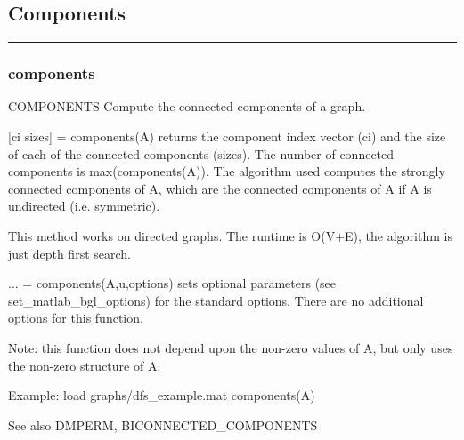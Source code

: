 \subsection*{Components}
\vspace{1cm}
\hrule
\subsubsection*{components}
\begin{mcode}
  COMPONENTS Compute the connected components of a graph.
 
  [ci sizes] = components(A) returns the component index vector (ci) and
  the size of each of the connected components (sizes).  The number of
  connected components is max(components(A)).  The algorithm used computes
  the strongly connected components of A, which are the connected
  components of A if A is undirected (i.e. symmetric).  
 
  This method works on directed graphs.
  The runtime is O(V+E), the algorithm is just depth first search.
 
  ... = components(A,u,options) sets optional parameters (see 
  set_matlab_bgl_options) for the standard options.
    There are no additional options for this function.
 
  Note: this function does not depend upon the non-zero values of A, but
  only uses the non-zero structure of A.
 
  Example: 
     load graphs/dfs_example.mat
     components(A)
 
  See also DMPERM, BICONNECTED_COMPONENTS
\end{mcode}
\newpage
